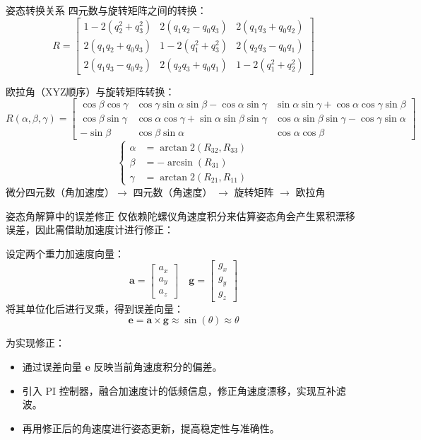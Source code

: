 \documentclass{beamer}
\begin{document}
	\begin{frame}{姿态转换关系}
		\small
		四元数与旋转矩阵之间的转换：
		\[
		R = \begin{bmatrix}
			1-2(q_2^2+q_3^2) & 2(q_1q_2 - q_0q_3) & 2(q_1q_3 + q_0q_2) \\
			2(q_1q_2 + q_0q_3) & 1-2(q_1^2+q_3^2) & 2(q_2q_3 - q_0q_1) \\
			2(q_1q_3 - q_0q_2) & 2(q_2q_3 + q_0q_1) & 1-2(q_1^2+q_2^2)
		\end{bmatrix}
		\]
		
		欧拉角（XYZ顺序）与旋转矩阵转换：
		{\scriptsize
			\[
			R(\alpha, \beta, \gamma) = \begin{bmatrix}
				\cos\beta\cos\gamma & \cos\gamma\sin\alpha\sin\beta - \cos\alpha\sin\gamma & \sin\alpha\sin\gamma + \cos\alpha\cos\gamma\sin\beta \\
				\cos\beta\sin\gamma & \cos\alpha\cos\gamma + \sin\alpha\sin\beta\sin\gamma & \cos\alpha\sin\beta\sin\gamma - \cos\gamma\sin\alpha \\
				-\sin\beta & \cos\beta\sin\alpha & \cos\alpha\cos\beta
			\end{bmatrix}
			\]
		}
		\[
		\left\{
		\begin{aligned}
			\alpha &= \arctan2(R_{32}, R_{33}) \\
			\beta &= -\arcsin(R_{31}) \\
			\gamma &= \arctan2(R_{21}, R_{11})
		\end{aligned}
		\right.
		\]
		微分四元数（角加速度）$\rightarrow$ 四元数（角速度） $\rightarrow$ 旋转矩阵 $\rightarrow$ 欧拉角
		
	\end{frame}
	
	\begin{frame}{姿态角解算中的误差修正}
		\small
		仅依赖陀螺仪角速度积分来估算姿态角会产生累积漂移误差，因此需借助加速度计进行修正：
		
		
		\vspace{0.2cm}
		设定两个重力加速度向量：
		\[
		\mathbf{a} = \begin{bmatrix} a_x \\ a_y \\ a_z \end{bmatrix} \quad
		\mathbf{g} = \begin{bmatrix} g_x \\ g_y \\ g_z \end{bmatrix}
		\]
		将其单位化后进行叉乘，得到误差向量：
		\[
		\mathbf{e} = \mathbf{a} \times \mathbf{g} \approx \sin(\theta) \approx \theta
		\]
		
		\vspace{0.2cm}
		为实现修正：
		\begin{itemize}
			\item 通过误差向量 $\mathbf{e}$ 反映当前角速度积分的偏差。
			\item 引入 PI 控制器，融合加速度计的低频信息，修正角速度漂移，实现互补滤波。
			\item 再用修正后的角速度进行姿态更新，提高稳定性与准确性。
		\end{itemize}
	\end{frame}
	
\end{document}
